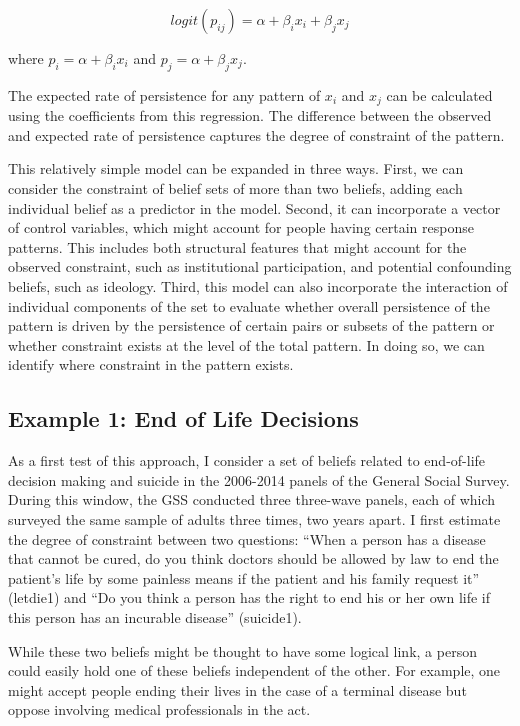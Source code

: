 \documentclass[12pt,]{article}
\begin{document}
\[logit(p_{ij}) = \alpha + \beta_ix_i + \beta_jx_j\]

where \(p_i = \alpha + \beta_ix_i\) and \(p_j = \alpha + \beta_jx_j\).

The expected rate of persistence for any pattern of \(x_i\) and \(x_j\) can be calculated using the coefficients from this regression. The difference between the observed and expected rate of persistence captures the degree of constraint of the pattern.

This relatively simple model can be expanded in three ways. First, we can consider the constraint of belief sets of more than two beliefs, adding each individual belief as a predictor in the model. Second, it can incorporate a vector of control variables, which might account for people having certain response patterns. This includes both structural features that might account for the observed constraint, such as institutional participation, and potential confounding beliefs, such as ideology. Third, this model can also incorporate the interaction of individual components of the set to evaluate whether overall persistence of the pattern is driven by the persistence of certain pairs or subsets of the pattern or whether constraint exists at the level of the total pattern. In doing so, we can identify where constraint in the pattern exists.

\hypertarget{example-1-end-of-life-decisions}{%
\subsection{Example 1: End of Life Decisions}\label{example-1-end-of-life-decisions}}

As a first test of this approach, I consider a set of beliefs related to end-of-life decision making and suicide in the 2006-2014 panels of the General Social Survey. During this window, the GSS conducted three three-wave panels, each of which surveyed the same sample of adults three times, two years apart. I first estimate the degree of constraint between two questions: ``When a person has a disease that cannot be cured, do you think doctors should be allowed by law to end the patient's life by some painless means if the patient and his family request it'' (letdie1) and ``Do you think a person has the right to end his or her own life if this person has an incurable disease'' (suicide1).

While these two beliefs might be thought to have some logical link, a person could easily hold one of these beliefs independent of the other. For example, one might accept people ending their lives in the case of a terminal disease but oppose involving medical professionals in the act.
\end{document}
